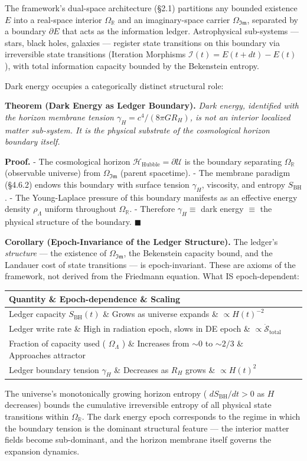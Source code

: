 \documentclass[11pt,a4paper]{article}
\theoremstyle{definition}\newtheorem{definition}{Definition}
\theoremstyle{remark}\newtheorem{remark}{Remark}
\begin{document}
The framework's dual-space architecture (§2.1) partitions any bounded existence $E$ into a real-space interior $\Omega_{\mathbb{R}}$ and an imaginary-space carrier $\Omega_{\mathfrak{Im}}$, separated by a boundary $\partial E$ that acts as the information ledger. Astrophysical sub-systems — stars, black holes, galaxies — register state transitions on this boundary via irreversible state transitions (Iteration Morphisms $\mathcal{I}(t) = E(t+dt) - E(t)$ ), with total information capacity bounded by the Bekenstein entropy.

Dark energy occupies a categorically distinct structural role:

\textbf{Theorem (Dark Energy as Ledger Boundary).} \textit{Dark energy, identified with the horizon membrane tension $\gamma_H = c^4/(8\pi G R_H)$, is not an interior localized matter sub-system. It is the physical substrate of the cosmological horizon boundary itself.}

\textbf{Proof.}
- The cosmological horizon $\mathcal{H}_{\text{Hubble}} = \partial\mathcal{U}$ is the boundary separating $\Omega_{\mathbb{R}}$ (observable universe) from $\Omega_{\mathfrak{Im}}$ (parent spacetime).
- The membrane paradigm (§4.6.2) endows this boundary with surface tension $\gamma_H$, viscosity, and entropy $S_{\text{BH}}$.
- The Young-Laplace pressure of this boundary manifests as an effective energy density $\rho_\Lambda$ uniform throughout $\Omega_{\mathbb{R}}$.
- Therefore $\gamma_H \equiv$ dark energy $\equiv$ the physical structure of the boundary. $\blacksquare$

\textbf{Corollary (Epoch-Invariance of the Ledger Structure).} The ledger's \textit{structure} — the existence of $\Omega_{\mathfrak{Im}}$, the Bekenstein capacity bound, and the Landauer cost of state transitions — is epoch-invariant. These are axioms of the framework, not derived from the Friedmann equation. What IS epoch-dependent:

\begin{longtable}{lll}
\hline
Quantity \& Epoch-dependence \& Scaling \\
\hline
Ledger capacity $S_{\text{BH}}(t)$ \& Grows as universe expands \& $\propto H(t)^{-2}$ \\
Ledger write rate \& High in radiation epoch, slows in DE epoch \& $\propto \dot{\mathcal{S}}_{\text{total}}$ \\
Fraction of capacity used ( $\Omega_\Lambda$ ) \& Increases from $\sim 0$ to $\sim 2/3$ \& Approaches attractor \\
Ledger boundary tension $\gamma_H$ \& Decreases as $R_H$ grows \& $\propto H(t)^2$ \\
\hline
\end{longtable}
The universe's monotonically growing horizon entropy ( $dS_{\text{BH}}/dt > 0$ as $H$ decreases) bounds the cumulative irreversible entropy of all physical state transitions within $\Omega_{\mathbb{R}}$. The dark energy epoch corresponds to the regime in which the boundary tension is the dominant structural feature — the interior matter fields become sub-dominant, and the horizon membrane itself governs the expansion dynamics.
\end{document}
